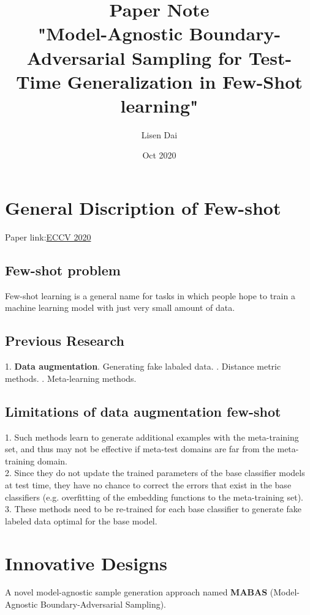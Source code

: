 \documentclass{article}
\title{
    {Paper Note}\\
    {\large "Model-Agnostic Boundary-Adversarial Sampling for Test-Time Generalization in Few-Shot learning"}
}
\author{Lisen Dai}
\date{Oct 2020}
\begin{document}
\maketitle

\section{General Discription of Few-shot}
Paper link:\href{https://www.ecva.net/papers/eccv_2020/papers_ECCV/papers/123460579.pdf}{ECCV 2020}
\subsection{Few-shot problem}
Few-shot learning is a general name for tasks in which people hope
to train a machine learning model with just very small amount of data. \newline

\subsection{Previous Research}
1. \textbf{Data augmentation}. Generating fake labaled data. . Distance metric methods. . Meta-learning methods. \newline

\subsection{Limitations of data augmentation few-shot}
1. Such methods learn to generate additional examples with the 
meta-training set, and thus may not be effective if meta-test domains are far from the meta-training domain. \\
2. Since they do not update the trained parameters of the base 
classifier models at test time, they have no chance to correct the 
errors that exist in the base classifiers (e.g. overfitting of the embedding functions to the meta-training set). \\
3. These methods need to be re-trained for each base classifier 
to generate fake labeled data optimal for the base model. \\

\section{Innovative Designs}
A novel model-agnostic sample generation approach named \textbf{MABAS} (Model-Agnostic Boundary-Adversarial Sampling). \\
\end{document}
